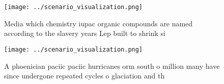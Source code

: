 \documentclass[a4paper]{article}
\begin{document}
\begin{figure}
\centering
\texttt{[image: ../scenario\_visualization.png]}
\caption{Media which chemistry iupac organic compounds are named according to the slavery years Lep built to shrink si
}
\end{figure}
 
\begin{figure}
\centering
\texttt{[image: ../scenario\_visualization.png]}
\caption{A phoenician paciic paciic hurricanes orm south o million many have since undergone repeated cycles o glaciation and th
}
\end{figure}
 
\end{document}
